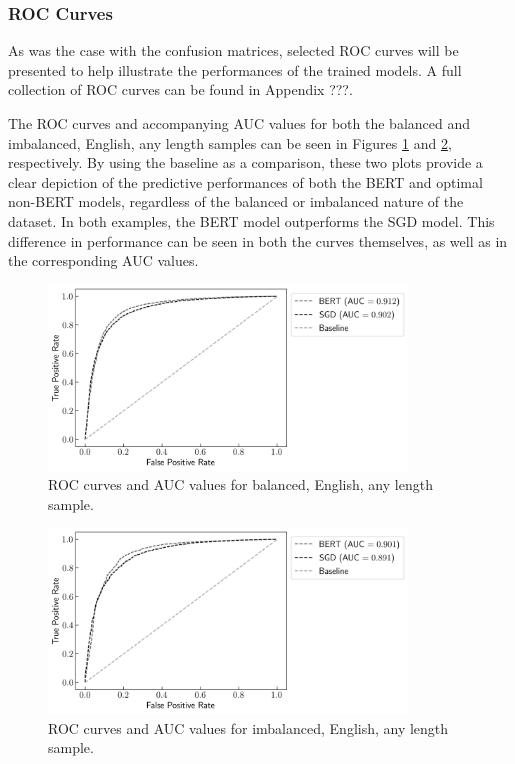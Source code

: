 \subsubsection{ROC Curves}

As was the case with the confusion matrices, selected ROC curves will be presented to help illustrate the performances of the trained models. A full collection of ROC curves can be found in Appendix ???.

The ROC curves and accompanying AUC values for both the balanced and imbalanced, English, any length samples can be seen in Figures \ref{fig:Res_RF_Pol_ROC_EBA} and \ref{fig:Res_RF_Pol_ROC_EIA}, respectively. By using the baseline as a comparison, these two plots provide a clear depiction of the predictive performances of both the BERT and optimal non-BERT models, regardless of the balanced or imbalanced nature of the dataset. In both examples, the BERT model outperforms the SGD model. This difference in performance can be seen in both the curves themselves, as well as in the corresponding AUC values.

\begin{figure}[ht]
    \centering
    \includegraphics[width=0.85\textwidth]{figures/06_results/01_rfp/01_pol/02_roc/eng_eq_any.png}
    \caption{ROC curves and AUC values for balanced, English, any length sample.}
    \label{fig:Res_RF_Pol_ROC_EBA}
\end{figure}

\begin{figure}[ht]
    \centering
    \includegraphics[width=0.85\textwidth]{figures/06_results/01_rfp/01_pol/02_roc/eng_any_any.png}
    \caption{ROC curves and AUC values for imbalanced, English, any length sample.}
    \label{fig:Res_RF_Pol_ROC_EIA}
\end{figure}

